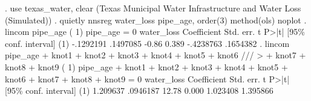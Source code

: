 . use texas_water, clear
(Texas Municipal Water Infrastructure and Water Loss (Simulated))
{\smallskip}
. quietly nnsreg water_loss pipe_age, order(3) method(ols) noplot
{\smallskip}
. lincom pipe_age
{\smallskip}
 ( 1)  pipe_age = 0
{\smallskip}
  water_loss {\VBAR} Coefficient  Std. err.      t    P>|t|     [95\% conf. interval]
         (1) {\VBAR}  -.1292191   .1497085    -0.86   0.389    -.4238763    .1654382
{\smallskip}
. lincom pipe_age + knot1 + knot2 + knot3 + knot4 + knot5 + knot6 ///
>     + knot7 + knot8 + knot9
{\smallskip}
 ( 1)  pipe_age + knot1 + knot2 + knot3 + knot4 + knot5 + knot6 + knot7 + knot8
       + knot9 = 0
{\smallskip}
  water_loss {\VBAR} Coefficient  Std. err.      t    P>|t|     [95\% conf. interval]
         (1) {\VBAR}   1.209637   .0946187    12.78   0.000     1.023408    1.395866
